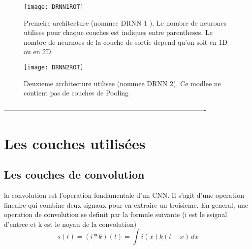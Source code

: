 % 

\begin{figure}[!ht]
   \begin{minipage}{0.6\textwidth}
     \centering
     \texttt{[image: DRNN1ROT]}
     \decoRule
     \caption[DRNN1]{Premeire architecture (nommee DRNN 1 \footnotemark ). Le nombre de neurones utilises pour chaque couches est indiques entre parentheses. Le nombre de neurnoes de la couche de sortie depend qu'on soit en 1D ou en 2D.}
     \label{Fig:DRNN1}
   \end{minipage}\hfill
   \begin{minipage}{0.4\textwidth}
     \centering
     \texttt{[image: DRNN2ROT]}
     \decoRule
     \caption[DRNN2]{Deuxieme architecture utilisee (nommee DRNN 2). Ce modlee ne contient pas de couches de Pooling \footnotemark }
     \label{Fig:DRNN2}
   \end{minipage}
\end{figure}
----------------------------------------------------------------------------------------

\section{Les couches utilisées}

\subsection{Les couches de convolution}
la convolution est l'operation fondamentale d'un CNN. Il s'agit d'une operation lineaire qui combine deux signaux pour en extraire un troisieme. En general, une operation de convolution se definit par la formule suivante (i est le ssignal d'entree et k est le noyau de la convolution)
$$ s(t) = (i * k)(t) = \int i(x)k(t-x) \, dx $$


